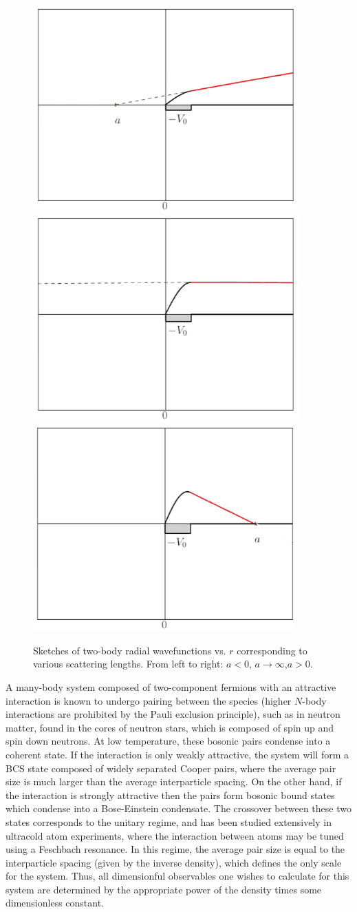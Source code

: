 \begin{figure}
\caption{\label{fig:a0}Sketches of two-body radial wavefunctions vs. $r$ corresponding to various scattering lengths. From left to right: $a<0$, $a\to\infty$,$a>0$.}
\includegraphics[width=0.3\linewidth]{Chapter5-figures/al0.png}
\includegraphics[width=0.3\linewidth]{Chapter5-figures/ae0.png}
\includegraphics[width=0.3\linewidth]{Chapter5-figures/ag0.png}
\end{figure}

A many-body system composed of two-component fermions with an attractive interaction is known to undergo pairing between the species (higher $N$-body interactions are prohibited by the Pauli exclusion principle), such as in neutron matter, found in the cores of neutron stars, which is composed of spin up and spin down neutrons. At low temperature, these bosonic pairs condense into a coherent state. If the interaction is only weakly attractive, the system will form a BCS state composed of widely separated Cooper pairs, where the average pair size is much larger than the average interparticle spacing. On the other hand, if the interaction is strongly attractive then the pairs form bosonic bound states which condense into a Bose-Einstein condensate. The crossover between these two states corresponds to the unitary regime, and has been studied extensively in ultracold atom experiments, where the interaction between atoms may be tuned using a Feschbach resonance. In this regime, the average pair size is equal to the interparticle spacing (given by the inverse density), which defines the only scale for the system. Thus, all dimensionful observables one wishes to calculate for this system are determined by the appropriate power of the density times some dimensionless constant. 

